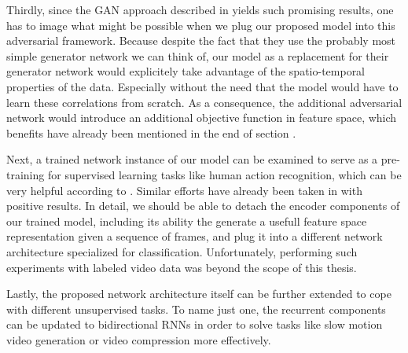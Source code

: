 Thirdly, since the GAN approach described in \label{sec:related_gan} yields such promising results, one has to image what might be possible when we plug our proposed model into this adversarial framework. Because despite the fact that they use the probably most simple generator network we can think of, our model as a replacement for their generator network would explicitely take advantage of the spatio-temporal properties of the data. Especially without the need that the model would have to learn these correlations from scratch. As a consequence, the additional adversarial network would introduce an additional objective function in feature space, which benefits have already been mentioned in the end of section \label{sec:impl-components}.

Next, a trained network instance of our model can be examined to serve as a pre-training for supervised learning tasks like human action recognition, which can be very helpful according to \parencite[p. 20]{deep_arch_ai}. Similar efforts have already been taken in \parencite{unsup_learn_lstm} with positive results. In detail, we should be able to detach the encoder components of our trained model, including its ability the generate a usefull feature space representation given a sequence of frames, and plug it into a different network architecture specialized for classification. Unfortunately, performing such experiments with labeled video data was beyond the scope of this thesis.

Lastly, the proposed network architecture itself can be further extended to cope with different unsupervised tasks. To name just one, the recurrent components can be updated to bidirectional RNNs in order to solve tasks like slow motion video generation or video compression more effectively.